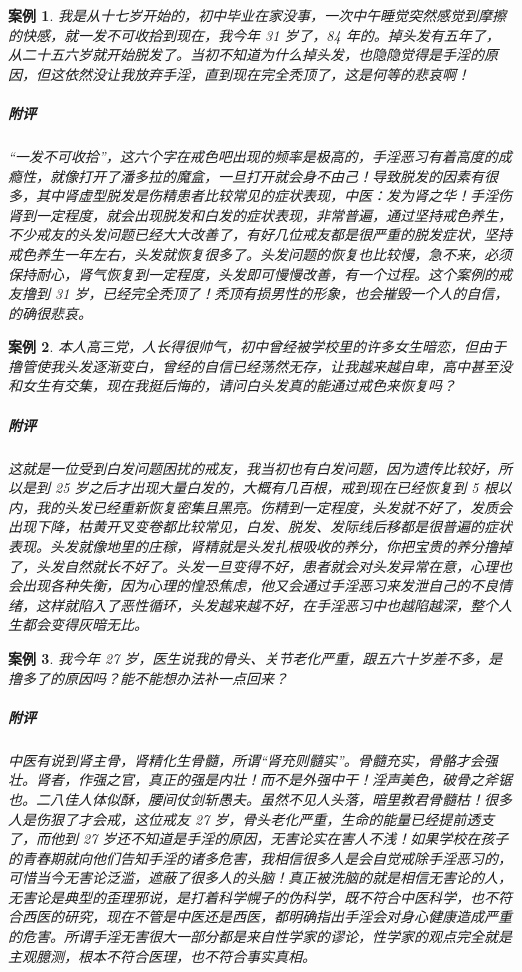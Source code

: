 \documentclass{ctexart}
\newtheorem{case}{案例}
\begin{document}
\begin{case}
    我是从十七岁开始的，初中毕业在家没事，一次中午睡觉突然感觉到摩擦的快感，就一发不可收拾到现在，我今年 31 岁了，84 年的。掉头发有五年了，从二十五六岁就开始脱发了。当初不知道为什么掉头发，也隐隐觉得是手淫的原因，但这依然没让我放弃手淫，直到现在完全秃顶了，这是何等的悲哀啊！
    \subparagraph{附评} “一发不可收拾”，这六个字在戒色吧出现的频率是极高的，手淫恶习有着高度的成瘾性，就像打开了潘多拉的魔盒，一旦打开就会身不由己！导致脱发的因素有很多，其中肾虚型脱发是伤精患者比较常见的症状表现，中医：发为肾之华！手淫伤肾到一定程度，就会出现脱发和白发的症状表现，非常普遍，通过坚持戒色养生，不少戒友的头发问题已经大大改善了，有好几位戒友都是很严重的脱发症状，坚持戒色养生一年左右，头发就恢复很多了。头发问题的恢复也比较慢，急不来，必须保持耐心，肾气恢复到一定程度，头发即可慢慢改善，有一个过程。这个案例的戒友撸到 31 岁，已经完全秃顶了！秃顶有损男性的形象，也会摧毁一个人的自信，的确很悲哀。
\end{case}

\begin{case}
    本人高三党，人长得很帅气，初中曾经被学校里的许多女生暗恋，但由于撸管使我头发逐渐变白，曾经的自信已经荡然无存，让我越来越自卑，高中甚至没和女生有交集，现在我挺后悔的，请问白头发真的能通过戒色来恢复吗？
    \subparagraph{附评} 这就是一位受到白发问题困扰的戒友，我当初也有白发问题，因为遗传比较好，所以是到 25 岁之后才出现大量白发的，大概有几百根，戒到现在已经恢复到 5 根以内，我的头发已经重新恢复密集且黑亮。伤精到一定程度，头发就不好了，发质会出现下降，枯黄开叉变卷都比较常见，白发、脱发、发际线后移都是很普遍的症状表现。头发就像地里的庄稼，肾精就是头发扎根吸收的养分，你把宝贵的养分撸掉了，头发自然就长不好了。头发一旦变得不好，患者就会对头发异常在意，心理也会出现各种失衡，因为心理的惶恐焦虑，他又会通过手淫恶习来发泄自己的不良情绪，这样就陷入了恶性循环，头发越来越不好，在手淫恶习中也越陷越深，整个人生都会变得灰暗无比。
\end{case}

\begin{case}
    我今年 27 岁，医生说我的骨头、关节老化严重，跟五六十岁差不多，是撸多了的原因吗？能不能想办法补一点回来？
    \subparagraph{附评} 中医有说到肾主骨，肾精化生骨髓，所谓“肾充则髓实”。骨髓充实，骨骼才会强壮。肾者，作强之官，真正的强是内壮！而不是外强中干！淫声美色，破骨之斧锯也。二八佳人体似酥，腰间仗剑斩愚夫。虽然不见人头落，暗里教君骨髓枯！很多人是伤狠了才会戒，这位戒友 27 岁，骨头老化严重，生命的能量已经提前透支了，而他到 27 岁还不知道是手淫的原因，无害论实在害人不浅！如果学校在孩子的青春期就向他们告知手淫的诸多危害，我相信很多人是会自觉戒除手淫恶习的，可惜当今无害论泛滥，遮蔽了很多人的头脑！真正被洗脑的就是相信无害论的人，无害论是典型的歪理邪说，是打着科学幌子的伪科学，既不符合中医科学，也不符合西医的研究，现在不管是中医还是西医，都明确指出手淫会对身心健康造成严重的危害。所谓手淫无害很大一部分都是来自性学家的谬论，性学家的观点完全就是主观臆测，根本不符合医理，也不符合事实真相。
\end{case}
\end{document}
